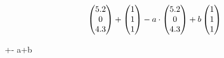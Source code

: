 \documentclass[presentation,aspectratio=169]{beamer}
\begin{document}
\begin{frame}
\begin{align*}
    \begin{pmatrix}  5.2 \\ 0 \\ 4.3  \end{pmatrix}+\begin{pmatrix}  1 \\ 1 \\ 1 \end{pmatrix}-
    a\cdot \begin{pmatrix}  5.2 \\ 0 \\ 4.3 \end{pmatrix}+b\begin{pmatrix}  1 \\ 1 \\ 1  \end{pmatrix}
\end{align*}    

\speakifytext
\begin{center}
    +-
    a\cdot {}+b
\end{center}
\endspeakifytext

\end{frame}
\end{document}
